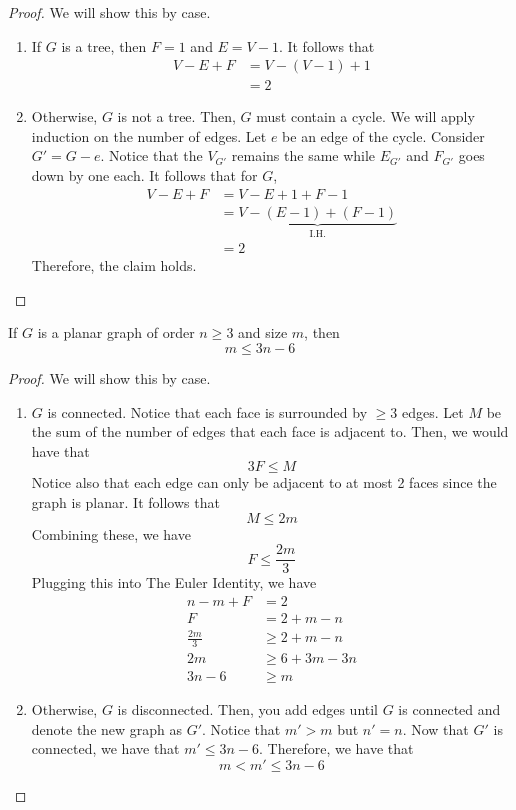 \begin{proof}
  We will show this by case.
  \begin{enumerate}
    \item If \(G\) is a tree, then \(F=1\) and \(E=V-1\). It
      follows that
      \[
        \begin{aligned}
          V-E+F &= V-(V-1)+1 \\
                &= 2
        \end{aligned}
      \]

    \item Otherwise, \(G\) is not a tree. Then, \(G\) must
      contain a cycle.
      We will apply induction on the number of edges.
      Let \(e\) be an edge of the cycle.
      Consider \(G' = G-e\). Notice that the \(V_{G'}\) remains
      the same while \(E_{G'}\) and \(F_{G'}\) goes down by one
      each. It follows that for \(G\),
      \[
        \begin{aligned}
          V - E + F &= V - E + 1 + F - 1 \\
                    &= \underbrace{V-(E-1)+(F-1)}_\text{I.H.} \\
                    &= 2 
        \end{aligned}
      \]
      Therefore, the claim holds.
  \end{enumerate}
\end{proof}

\begin{theorem}
  If \(G\) is a planar graph of order \(n \geq 3\) and size
  \(m\), then
  \[ m \leq 3 n-6 \]
\end{theorem}

\begin{proof}
  We will show this by case. 
  \begin{enumerate}
    \item \(G\) is connected. Notice that each face
      is surrounded by \(\geq 3\) edges. Let \(M\) be the 
      sum of the number of edges that each face is adjacent to. 
      Then, we would have that 
      \[ 3F \leq M \]
      Notice also that each edge can only be adjacent to at most
      2 faces since the graph is planar. It follows that
      \[ M \leq 2m \]
      Combining these, we have
      \[ F \leq \frac{2m}{3} \]
      Plugging this into The Euler Identity, we have
      \[
        \begin{aligned}
          n - m + F &= 2 \\
          F &= 2 + m - n \\
          \frac{2m}{3} &\geq 2 + m - n \\
          2m &\geq 6 + 3m - 3n \\ 
          3n - 6 &\geq m
        \end{aligned}
      \]

    \item Otherwise, \(G\) is disconnected. Then, you add edges
      until \(G\) is connected and denote the new graph as
      \(G'\). Notice that \(m' > m\) but \(n' = n\). Now that
      \(G'\) is connected, we have that \(m' \leq 3n-6\).
      Therefore, we have that
      \[ m < m' \leq 3n-6 \]
  \end{enumerate}
\end{proof}

